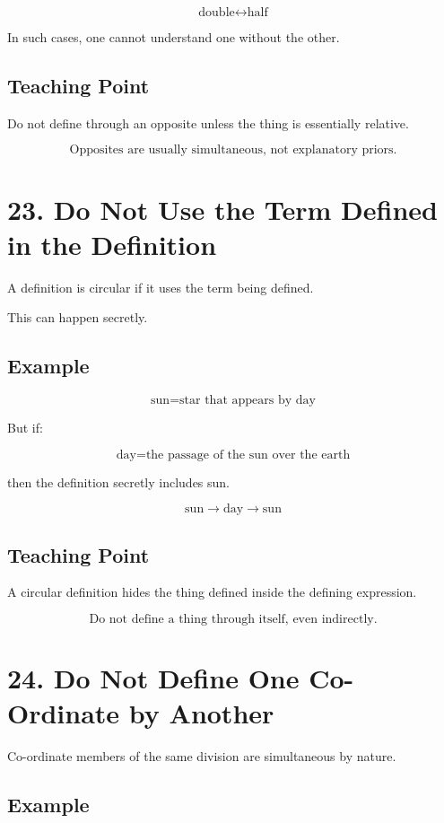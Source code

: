 \documentclass[12pt]{article}
\begin{document}
\[
\text{double} \leftrightarrow \text{half}
\]

In such cases, one cannot understand one without the other.

\subsection*{Teaching Point}

Do not define through an opposite unless the thing is essentially relative.

\[
\boxed{
\text{Opposites are usually simultaneous, not explanatory priors.}
}
\]

\section*{23. Do Not Use the Term Defined in the Definition}

A definition is circular if it uses the term being defined.

This can happen secretly.

\subsection*{Example}

\[
\text{sun} = \text{star that appears by day}
\]

But if:

\[
\text{day} = \text{the passage of the sun over the earth}
\]

then the definition secretly includes sun.

\[
\text{sun} \rightarrow \text{day} \rightarrow \text{sun}
\]

\subsection*{Teaching Point}

A circular definition hides the thing defined inside the defining expression.

\[
\boxed{
\text{Do not define a thing through itself, even indirectly.}
}
\]

\section*{24. Do Not Define One Co-Ordinate by Another}

Co-ordinate members of the same division are simultaneous by nature.

\subsection*{Example}
\end{document}
